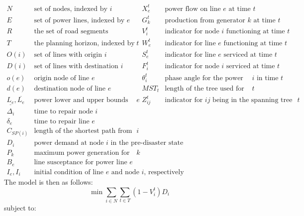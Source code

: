 \documentclass[10pt]{article}
\begin{document}
\begin{displaymath}
\begin{array}{llll}
	 N & \mbox{set of nodes, indexed by $i$} & X_{e}^{t} & \mbox{power flow on line $e$ at time $t$}\\
	 E & \mbox{set of power lines, indexed by $e$} & G_{k}^t & \mbox{production from generator $k$ at time $t$}\\
	 R & \mbox{the set of road segments} & V_i^t & \mbox{indicator for node $i$ functioning at time $t$}\\
	 T & \mbox{the planning horizon, indexed by $t$} & W_{e}^t & \mbox{indicator for line $e$ functioning at time $t$} \\
	 O(i) & \mbox{set of lines with origin $i$} & S_{e}^t & \mbox{indicator for line $e$ serviced at time $t$}\\
	 D(i) & \mbox{set of lines with destination $i$} & F_i^t & \mbox{indicator for node $i$ serviced at time $t$}\\
	 o(e) & \mbox{origin node of line $e$} & \theta_i^t & \mbox{phase angle for the power flow at $i$ in time $t$}\\
	 d(e) & \mbox{destination node of line $e$} & MST_t & \mbox{length of the tree used for ``routing'' at $t$} \\
	 \underline{L_e},\overline{L_e} & \mbox{power lower and upper bounds for line $e$}& Z_{ij}^t & \mbox{indicator for $ij$ being in the spanning tree at $t$}\\
	 \Delta_{i} & \mbox{time to repair node $i$} \\
	 \delta_{e} & \mbox{time to repair line $e$}\\
	  C_{SP(i)} & \mbox{length of the shortest path from depot to node $i$}\\
	  D_i & \mbox{power demand at node $i$ in the pre-disaster state}\\
	  P_k & \mbox{maximum power generation for generator $k$}\\
	  B_e&  \mbox{line susceptance for power line $e$}\\
	 I_e, I_i & \mbox{initial condition of line $e$ and node $i$, respectively}
\end{array}
\end{displaymath}
\normalsize
The model is then as follows:
\begin{equation}
\min \sum_{i \in N} \sum_{t \in T} (1-V_i^t)D_i
\end{equation}
subject to:
\end{document}
